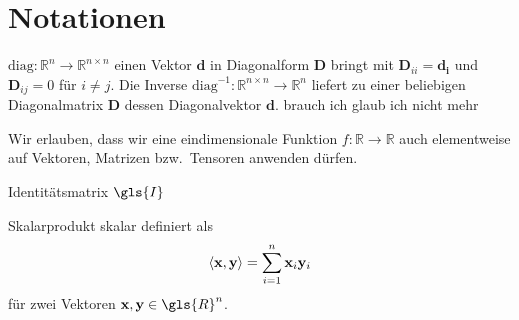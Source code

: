 \section{Notationen}

$\text{diag} \colon \mathbb{R}^n \to \mathbb{R}^{n \times n}$ einen Vektor $\mathbf{d}$ in Diagonalform $\mathbf{D}$ bringt mit $\mathbf{D}_{ii} = \mathbf{d_i}$ und $\mathbf{D}_{ij} = 0$ für $i \neq j$.
Die Inverse $\text{diag}^{-1} \colon \mathbb{R}^{n \times n} \to \mathbb{R}^n$ liefert zu einer beliebigen Diagonalmatrix $\mathbf{D}$ dessen Diagonalvektor $\mathbf{d}$.
brauch ich glaub ich nicht mehr

Wir erlauben, dass wir eine eindimensionale Funktion $f \colon \mathbb{R} \to \mathbb{R}$ auch elementweise auf Vektoren, Matrizen bzw.\ Tensoren anwenden dürfen.

Identitätsmatrix $\gls{I}$

Skalarprodukt \gls{skalar} definiert als
\begin{equation}
  \left\langle \ve{x}, \ve{y} \right\rangle = \sum_{i=1}^n \ve{x}_i \ve{y}_i
\end{equation}
für zwei Vektoren $\ve{x}, \ve{y} \in \gls{R}^n$.

